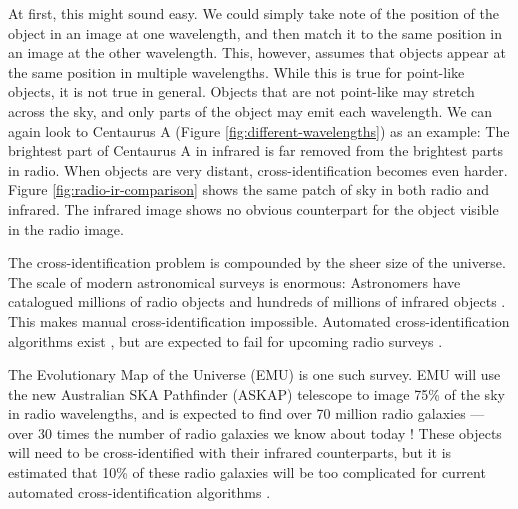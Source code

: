 At first, this might sound easy. We could simply take note of the position of
the object in an image at one wavelength, and then match it to the same
position in an image at the other wavelength. This, however, assumes that
objects appear at the same position in multiple wavelengths. While this is
true for point-like objects, it is not true in general. Objects that are not
point-like may stretch across the sky, and only parts of the object may emit
each wavelength. We can again look to Centaurus A (Figure
\ref{fig:different-wavelengths}) as an example: The brightest part of
Centaurus A in infrared is far removed from the brightest parts in radio. When
objects are very distant, cross-identification becomes even harder. Figure
\ref{fig:radio-ir-comparison} shows the same patch of sky in both radio and
infrared. The infrared image shows no obvious counterpart for the object visible
in the radio image.


The cross-identification problem is compounded by the sheer size of the
universe. The scale of modern astronomical surveys is enormous: Astronomers
have catalogued millions of radio objects \citep{banfield15} and hundreds of
millions of infrared objects \citep{cutri13}. This makes manual
cross-identification impossible. Automated cross-identification algorithms
exist \citep{proctor06, fan15}, but are expected to fail for upcoming radio
surveys \citep{banfield15}.

The Evolutionary Map of the Universe (EMU) \citep{norris11} is one such survey.
EMU will use the new Australian SKA Pathfinder (ASKAP) telescope to image 75\%
of the sky in radio wavelengths, and is expected to find over 70 million radio
galaxies --- over 30 times the number of radio galaxies we know about today
\citep{banfield15}! These objects will need to be cross-identified with their
infrared counterparts, but it is estimated that 10\% of these radio galaxies
will be too complicated for current automated cross-identification algorithms
\citep{banfield15, norris11}.

